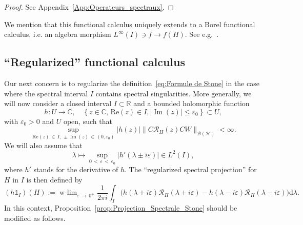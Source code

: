 \documentclass[10pt]{amsart}
\theoremstyle{definition}\newtheorem{defi}[theo]{Definition}\newtheorem{rema}[theo]{Remark}\newtheorem{exam}[theo]{Example}\newtheorem{exem}[theo]{Example}\newtheorem{nota}[theo]{Notation}
\newcommand{\Hi}{\mathcal{H}}
\newcommand{\bbC}{\mathbb{C}}
\newcommand{\R}{\mathbb{R}}
\newcommand{\rmd}{\mathrm{d}}
\newcommand{\Res}{\mathcal{R}}
\newcommand{\clB}{\mathcal{B}}
\DeclareMathOperator{\wlim}{w-lim}
\DeclareMathOperator{\im}{Im}
\begin{document}
\begin{proof}
See Appendix~\ref{App:Operateurs_spectraux}.
\end{proof}

We mention that this functional calculus uniquely extends to a Borel functional calculus, i.e. an algebra morphism $L^\infty(I)\ni f\to f(H)$. See e.g.~\cite[Theorem~2.4]{GeGeHa13_01}.


\subsection{``Regularized'' functional calculus}\label{subsec:regul_funct_calc}


Our next concern is to regularize the definition~\eqref{eq:Formule de Stone} in the case where the spectral interval $I$ contains spectral singularities. More generally, we will now consider a closed interval $I\subset\R$ and a bounded holomorphic function
\begin{equation*}
h:U\to\bbC, \quad \left\{z\in\bbC,\, \mathrm{Re}(z)\in I, |\im(z)|\le\varepsilon_0\right\}\subset U,
\end{equation*}
with $\varepsilon_0>0$ and $U$ open, such that
\begin{equation}\label{eq:limit_uniform_I_sing}
\sup_{\mathrm{Re}(z)\,\in\,I,\,\pm\im(z)\,\in\,(0,\varepsilon_0)} |h(z)| \big\|C\Res_H(z)CW\big\|_{\clB(\Hi)}<\infty.
\end{equation}
We will also assume that
\begin{equation}\label{eq:h_assumpt}
\lambda\mapsto\sup_{0\,<\,\varepsilon\,<\,\varepsilon_0}\left|h'(\lambda\pm i\varepsilon)\right| \in L^2(I),
\end{equation}
where $h'$ stands for the derivative of $h$. The ``regularized spectral projection'' for $H$ in $I$ is then defined by
\begin{equation}\label{eq:Formule de Stone_regul}
(h \mathds{1}_I)(H):=\wlim_{\varepsilon\,\rightarrow\,0^+}\frac{1}{2\pi i}\int_I\big(h(\lambda+i\varepsilon)\Res_H(\lambda+i\varepsilon)-h(\lambda-i\varepsilon)\Res_H(\lambda-i\varepsilon)\big)\rmd \lambda.
\end{equation}
In this context, Proposition~\ref{prop:Projection_Spectrale_Stone} should be modified as follows.
\end{document}
